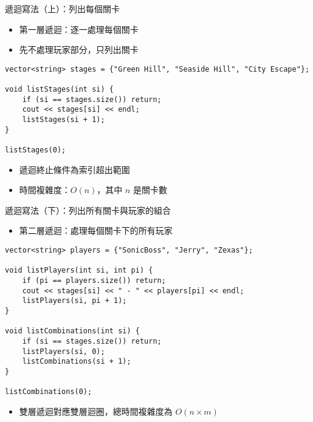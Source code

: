 \documentclass{beamer}
\begin{document}
\begin{frame}[fragile]{遞迴寫法（上）：列出每個關卡}
\begin{itemize}
    \item 第一層遞迴：逐一處理每個關卡
    \item 先不處理玩家部分，只列出關卡
\end{itemize}

\vspace{0.5em}
\begin{lstlisting}[style=cppstyle]
vector<string> stages = {"Green Hill", "Seaside Hill", "City Escape"};

void listStages(int si) {
    if (si == stages.size()) return;
    cout << stages[si] << endl;
    listStages(si + 1);
}

listStages(0);
\end{lstlisting}

\vspace{0.5em}
\begin{itemize}
    \item 遞迴終止條件為索引超出範圍
    \item 時間複雜度：$O(n)$，其中 $n$ 是關卡數
\end{itemize}
\end{frame}

\begin{frame}[fragile]{遞迴寫法（下）：列出所有關卡與玩家的組合}
\begin{itemize}
    \item 第二層遞迴：處理每個關卡下的所有玩家
\end{itemize}

\vspace{0.5em}
\begin{lstlisting}[style=cppstyle]
vector<string> players = {"SonicBoss", "Jerry", "Zexas"};

void listPlayers(int si, int pi) {
    if (pi == players.size()) return;
    cout << stages[si] << " - " << players[pi] << endl;
    listPlayers(si, pi + 1);
}

void listCombinations(int si) {
    if (si == stages.size()) return;
    listPlayers(si, 0);
    listCombinations(si + 1);
}

listCombinations(0);
\end{lstlisting}

\vspace{0.5em}
\begin{itemize}
    \item 雙層遞迴對應雙層迴圈，總時間複雜度為 $O(n \times m)$
\end{itemize}
\end{frame}
\end{document}
